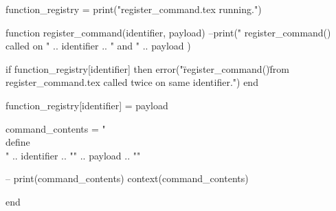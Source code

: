 

\startluacode

	function_registry = {}
	print("register_command.tex running.\n")

function register_command(identifier, payload)
	--print("    register_command() called on " .. identifier .. " and " .. payload )


	if function_registry[identifier] then
		error("\"register_command()\" from register_command.tex called twice on same identifier.")
	end

	function_registry[identifier] = payload 

	command_contents = "\\define\\" .. identifier .. "{" .. payload .. "}"

	-- print(command_contents)
	context(command_contents)

end


\stopluacode


